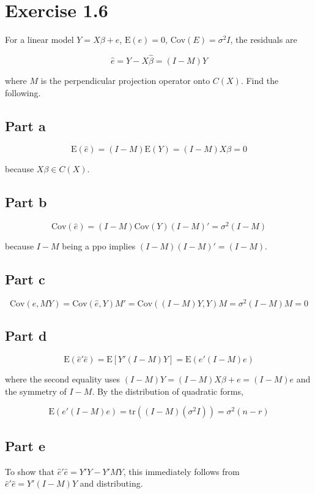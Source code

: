 \documentclass{article}
\newcommand{\E}{\text{E}}
\newcommand{\cov}{\text{Cov}}
\newcommand{\tr}{\text{tr}}
\begin{document}
\section*{Exercise 1.6}

For a linear model $Y=X\beta+e$, $\E(e)=0$, $\cov(E)=\sigma^2I$, the residuals are

\[
\hat{e} = Y-X\hat{\beta} = (I-M)Y
\]

where $M$ is the perpendicular projection operator onto $C(X)$. Find the following.

\subsection*{Part a}

\[
\E(\hat{e}) = (I-M)\E(Y) = (I-M)X\beta = 0
\]

because $X\beta \in C(X)$.

\subsection*{Part b}

\[
\cov(\hat{e}) = (I-M)\cov(Y)(I-M)' = \sigma^2(I-M)
\]

because $I-M$ being a ppo implies $(I-M)(I-M)' = (I-M)$.

\subsection*{Part c}

\[
\cov(\hat{e},MY) = \cov(\hat{e},Y)M' = \cov((I-M)Y,Y)M = \sigma^2(I-M)M = 0
\]

\subsection*{Part d}

\[
\E(\hat{e}'\hat{e}) = \E[Y'(I-M)Y] = \E(e'(I-M)e)
\]

where the second equality uses $(I-M)Y = (I-M)X\beta+e = (I-M)e$ and the symmetry of $I-M$. By the distribution of quadratic forms,

\[
\E(e'(I-M)e) = \tr((I-M)(\sigma^2I)) = \sigma^2(n-r)
\]

\subsection*{Part e}

To show that $\hat{e}'\hat{e} = Y'Y-Y'MY$, this immediately follows from $\hat{e}'\hat{e}=Y'(I-M)Y$ and distributing.
\end{document}
